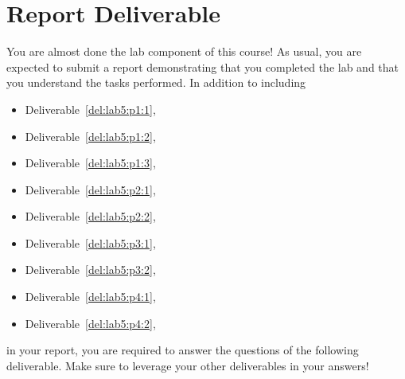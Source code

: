 \section{Report Deliverable}\label{Lab:5:Report}
You are almost done the lab component of this course!
As usual, you are expected to submit a report demonstrating that you completed the lab and that you understand the tasks performed.
In addition to including
\begin{itemize}
  \item{Deliverable~\ref{del:lab5:p1:1},}
  \item{Deliverable~\ref{del:lab5:p1:2},}
  \item{Deliverable~\ref{del:lab5:p1:3},}
  \item{Deliverable~\ref{del:lab5:p2:1},}
  \item{Deliverable~\ref{del:lab5:p2:2},}
  \item{Deliverable~\ref{del:lab5:p3:1},}
  \item{Deliverable~\ref{del:lab5:p3:2},}
  \item{Deliverable~\ref{del:lab5:p4:1},}
  \item{Deliverable~\ref{del:lab5:p4:2},}
\end{itemize}
in your report, you are required to answer the questions of the following deliverable.
Make sure to leverage your other deliverables in your answers!
